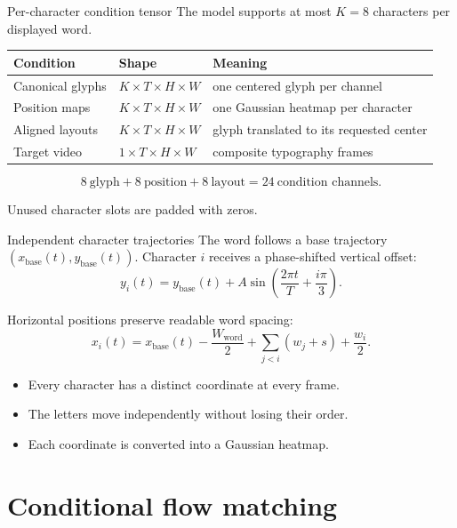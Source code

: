 \documentclass[aspectratio=169,xcolor=svgnames]{beamer}
\begin{document}
\begin{frame}{Per-character condition tensor}
The model supports at most $K=8$ characters per displayed word.

\begin{center}
\begin{tabular}{lll}
\hline
Condition & Shape & Meaning \\
\hline
Canonical glyphs & $K\times T\times H\times W$ & one centered glyph per channel \\
Position maps & $K\times T\times H\times W$ & one Gaussian heatmap per character \\
Aligned layouts & $K\times T\times H\times W$ & glyph translated to its requested center \\
Target video & $1\times T\times H\times W$ & composite typography frames \\
\hline
\end{tabular}
\end{center}

\[
8\ \text{glyph}+8\ \text{position}+8\ \text{layout}
=24\ \text{condition channels}.
\]

Unused character slots are padded with zeros.
\end{frame}

\begin{frame}{Independent character trajectories}
The word follows a base trajectory $(x_{\mathrm{base}}(t),y_{\mathrm{base}}(t))$.
Character $i$ receives a phase-shifted vertical offset:
\[
y_i(t)=y_{\mathrm{base}}(t)
+A\sin\left(\frac{2\pi t}{T}+\frac{i\pi}{3}\right).
\]

Horizontal positions preserve readable word spacing:
\[
x_i(t)=x_{\mathrm{base}}(t)-\frac{W_{\mathrm{word}}}{2}
+\sum_{j<i}(w_j+s)+\frac{w_i}{2}.
\]

\begin{itemize}
    \item Every character has a distinct coordinate at every frame.
    \item The letters move independently without losing their order.
    \item Each coordinate is converted into a Gaussian heatmap.
\end{itemize}
\end{frame}

\section{Conditional flow matching}
\end{document}
